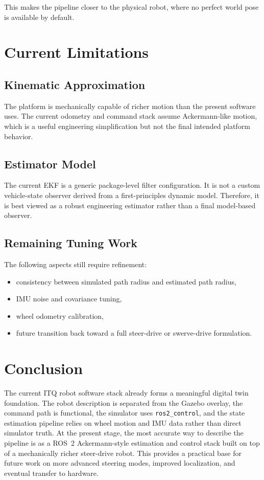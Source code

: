 \documentclass[12pt,a4paper]{report}
\begin{document}
This makes the pipeline closer to the physical robot, where no perfect world pose is available by default.

\chapter{Current Limitations}

\section{Kinematic Approximation}
The platform is mechanically capable of richer motion than the present software uses. The current odometry and command stack assume Ackermann-like motion, which is a useful engineering simplification but not the final intended platform behavior.

\section{Estimator Model}
The current EKF is a generic package-level filter configuration. It is not a custom vehicle-state observer derived from a first-principles dynamic model. Therefore, it is best viewed as a robust engineering estimator rather than a final model-based observer.

\section{Remaining Tuning Work}
The following aspects still require refinement:
\begin{itemize}[leftmargin=*]
  \item consistency between simulated path radius and estimated path radius,
  \item IMU noise and covariance tuning,
  \item wheel odometry calibration,
  \item future transition back toward a full steer-drive or swerve-drive formulation.
\end{itemize}

\chapter{Conclusion}
The current ITQ robot software stack already forms a meaningful digital twin foundation. The robot description is separated from the Gazebo overlay, the command path is functional, the simulator uses \texttt{ros2\_control}, and the state estimation pipeline relies on wheel motion and IMU data rather than direct simulator truth. At the present stage, the most accurate way to describe the pipeline is as a ROS~2 Ackermann-style estimation and control stack built on top of a mechanically richer steer-drive robot. This provides a practical base for future work on more advanced steering modes, improved localization, and eventual transfer to hardware.
\end{document}
